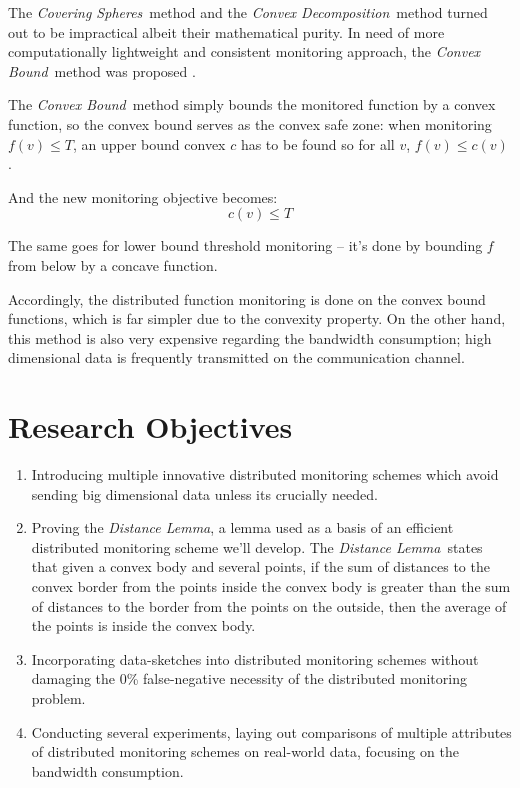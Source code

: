 \documentclass[11pt, conference]{article}
\newcommand{\distanceLemma}{\textit{Distance Lemma}}
\newcommand{\coveringSpheres}{\textit{Covering Spheres}}
\newcommand{\convexDecomposition}{\textit{Convex Decomposition}}
\newcommand{\convexBound}{\textit{Convex Bound}}
\begin{document}
The \coveringSpheres \ method and the \convexDecomposition \ method turned out to be impractical albeit their mathematical purity. In need of more computationally lightweight and consistent monitoring approach, the \convexBound \ method was proposed \cite{lazerson2018lightweight}.

The \convexBound \ method simply bounds the monitored function by a convex function, so the convex bound serves as the convex safe zone: when monitoring $f(v) \leq T$, an upper bound convex $c$ has to be found so for all $v$, $f(v) \leq  c(v)$.

And the new monitoring objective becomes:
\begin{equation}
\label{monitoringConstraint}
c(v) \leq T
\end{equation}

The same goes for lower bound threshold monitoring -- it's done by bounding $f$ from below by a concave function.

Accordingly, the distributed function monitoring is done on the convex bound functions, which is far simpler due to the convexity property. On the other hand, this method is also very expensive regarding the bandwidth consumption; high dimensional data is frequently transmitted on the communication channel.

\section{Research Objectives}

\begin{enumerate}
\item Introducing multiple innovative distributed monitoring schemes which avoid sending big dimensional data unless its crucially needed.

\item Proving the \distanceLemma , a lemma used as a basis of an efficient distributed monitoring scheme we'll develop. The \distanceLemma \ states that given a convex body and several points, if the sum of distances to the convex border from the points inside the convex body is greater than the sum of distances to the border from the points on the outside, then the average of the points is inside the convex body.

\item Incorporating data-sketches into distributed monitoring schemes without damaging the 0\% false-negative necessity of the distributed monitoring problem.

\item Conducting several experiments, laying out comparisons of multiple attributes of distributed monitoring schemes on real-world data, focusing on the bandwidth consumption.
\end{enumerate}



	
\end{document}
